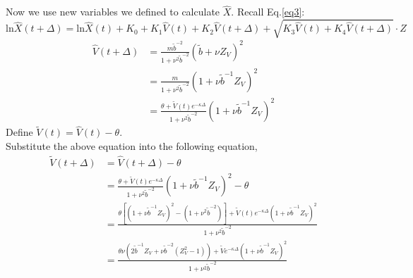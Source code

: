 \documentclass{ws-ijfe}
\begin{document}
Now we use new variables we defined to calculate $\hat{X}$. Recall Eq.\eqref{eq3}:
\begin{equation*}
  \text{ln}\hat{X}(t+\Delta)=\text{ln}\hat{X}(t)+K_0+K_1\hat{V}(t)+K_2\hat{V}(t+\Delta)+\sqrt{K_3\hat{V}(t)+K_4\hat{V}(t+\Delta)}\cdot Z
\end{equation*}
\begin{equation*}
\begin{split}
\hat{V}(t+\Delta)&=\frac{m\tilde{b}^{-2}}{1+\nu^2\tilde{b}^{-2}}(\tilde{b}+\nu Z_V)^2\\
&=\frac{m}{1+\nu^2\tilde{b}^{-2}}(1+\nu\tilde{b}^{-1}Z_V)^2\\
&=\frac{\theta+\tilde{V}(t)e^{-\kappa\Delta}}{1+\nu^2\tilde{b}^{-2}}(1+\nu\tilde{b}^{-1}Z_V)^2
\end{split}
\end{equation*}
Define $\tilde{V}(t)=\hat{V}(t)-\theta$. \\
Substitute the above equation into the following equation,
\begin{equation*}
\begin{split}
\tilde{V}(t+\Delta)&=\hat{V}(t+\Delta)-\theta\\
&=\frac{\theta+\tilde{V}(t)e^{-\kappa\Delta}}{1+\nu^2\tilde{b}^{-2}}(1+\nu\tilde{b}^{-1}Z_V)^2-\theta\\
&=\frac{\theta[(1+\nu\tilde{b}^{-1}Z_V)^2-(1+\nu^2\tilde{b}^{-2})]+\tilde{V}(t)e^{-\kappa\Delta}(1+\nu\tilde{b}^{-1}Z_V)^2}{1+\nu^2\tilde{b}^{-2}}\\
&=\frac{\theta\nu(2\tilde{b}^{-1}Z_V+\nu\tilde{b}^{-2}(Z_V^2-1))+\tilde{V}e^{-\kappa\Delta}(1+\nu\tilde{b}^{-1}Z_V)^2}{1+\nu^2\tilde{b}^{-2}}
\end{split}
\end{equation*}
\end{document}
